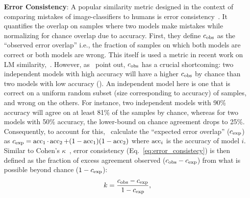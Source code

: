 \textbf{Error Consistency}: A popular similarity metric designed in the context of comparing mistakes of image-classifiers to humans is error consistency~\citep{geirhos2020beyond}. It quantifies the overlap on samples where two models make mistakes while normalizing for chance overlap due to accuracy. First, they define $c_{\text{obs}}$ as the ``observed error overlap'' i.e., the fraction of samples on which both models are correct or both models are wrong. This itself is used a metric in recent work on LM similarity,~\citet{dutta2024accuracy}. However, as~\citet{geirhos2020beyond} point out, $c_{\text{obs}}$ has a crucial shortcoming: two independent models with high accuracy will have a higher $c_{\text{obs}}$ by chance than two models with low accuracy (). An independent model here is one that is correct on a uniform random subset (size corresponding to accuracy) of samples, and wrong on the others. For instance, two independent models with 90\% accuracy will agree on at least 81\% of the samples by chance, whereas for two models with 50\% accuracy, the lower-bound on chance agreement drops to 25\%. Consequently, to account for this,~\citet{geirhos2020beyond} calculate the ``expected error overlap'' ($c_{\text{exp}}$) as $c_{\text{exp}} = \operatorname{acc}_1 \cdot \operatorname{acc}_2 + (1 - \operatorname{acc}_1)(1 - \operatorname{acc}_2)$ where $\operatorname{acc}_i$ is the accuracy of model $i$. Similar to Cohen's $\kappa$~\citep{cohen1960coefficient}, error consistency (Eq.~\ref{eq:error_consistecy}) is then defined as the fraction of excess agreement observed ($c_{\text{obs}} - c_{\text{exp}}$) from what is possible beyond chance ($1 - c_{\text{exp}}$):
\begin{align} k = \frac{c_{\text{obs}} - c_{\text{exp}}}{1 - c_{\text{exp}}}, \label{eq:error_consistecy} 
\end{align} 

